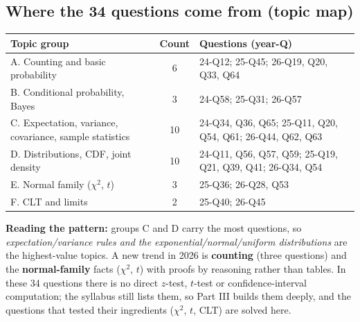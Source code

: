 \documentclass[11pt,a4paper]{article}
\begin{document}
\subsection{Where the 34 questions come from (topic map)}
\begin{center}
\small
\begin{tabularx}{\textwidth}{>{\raggedright\arraybackslash}p{4.3cm}cX}
\toprule
\textbf{Topic group} & \textbf{Count} & \textbf{Questions (year-Q)}\\\midrule
A. Counting and basic probability & 6 & 24-Q12; 25-Q45; 26-Q19, Q20, Q33, Q64\\
B. Conditional probability, Bayes & 3 & 24-Q58; 25-Q31; 26-Q57\\
C. Expectation, variance, covariance, sample statistics & 10 & 24-Q34, Q36, Q65; 25-Q11, Q20, Q54, Q61; 26-Q44, Q62, Q63\\
D. Distributions, CDF, joint density & 10 & 24-Q11, Q56, Q57, Q59; 25-Q19, Q21, Q39, Q41; 26-Q34, Q54\\
E. Normal family ($\chi^2$, $t$) & 3 & 25-Q36; 26-Q28, Q53\\
F. CLT and limits & 2 & 25-Q40; 26-Q45\\
\bottomrule
\end{tabularx}
\end{center}
\textbf{Reading the pattern:} groups C and D carry the most questions, so \emph{expectation/variance rules and the exponential/normal/uniform distributions} are the highest-value topics. A new trend in 2026 is \textbf{counting} (three questions) and the \textbf{normal-family} facts ($\chi^2$, $t$) with proofs by reasoning rather than tables. In these 34 questions there is no direct $z$-test, $t$-test or confidence-interval computation; the syllabus still lists them, so Part III builds them deeply, and the questions that tested their ingredients ($\chi^2$, $t$, CLT) are solved here.
\end{document}
